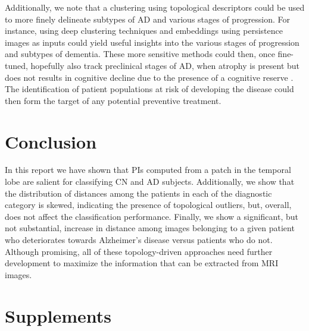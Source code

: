 \documentclass{article}
\begin{document}
Additionally, we note that a clustering using topological descriptors could be used to more finely delineate subtypes of AD and various stages of progression. For instance, using deep clustering techniques and embeddings using persistence images as inputs could yield useful insights into the various stages of progression and subtypes of dementia. These more sensitive methods could then, once fine-tuned, hopefully also track preclinical stages of AD, when atrophy is present but does not results in cognitive decline due to the presence of a cognitive reserve \citep{scarmeas2004cognitive, van2017neuroimaging}. The identification of patient populations at risk of developing the disease could then form the target of any potential preventive treatment.

\section{Conclusion}

In this report we have shown that PIs computed from a patch in the temporal lobe are salient for classifying CN and AD subjects. Additionally, we show that the distribution of distances among the patients in each of the diagnostic category is skewed, indicating the presence of topological outliers, but, overall, does not affect the classification performance. Finally, we show a significant, but not substantial, increase in distance among images belonging to a given patient who deteriorates towards Alzheimer's disease versus patients who do not. Although promising, all of these topology-driven approaches need further development to maximize the information that can be extracted from MRI images.

\clearpage



\clearpage
\appendix

\section{Supplements}
\end{document}
